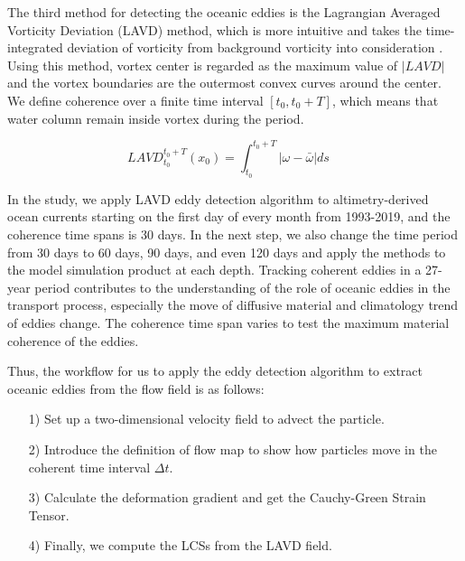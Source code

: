 The third method for detecting the oceanic eddies is the Lagrangian Averaged Vorticity Deviation (LAVD) method, which is more intuitive and takes the time-integrated deviation of vorticity from background vorticity into consideration \cite{haller2016defining,tarshish2018identifying}. Using this method, vortex center is regarded as the maximum value of $|LAVD|$ and the vortex boundaries are the outermost convex curves around the center. We define coherence over a finite time interval $[t_0,t_0+T]$, which means that water column remain inside vortex during the period.


\begin{equation}
    LAVD_{t_0}^{t_0+T}(x_{0})=\int_{t_0}^{t_0+T}|\omega-\bar{\omega}| d s \quad 
\end{equation}

In the study, we apply LAVD eddy detection algorithm to altimetry-derived ocean currents starting on the first day of every month from 1993-2019, and the coherence time spans is 30 days. In the next step, we also change the time period from 30 days to 60 days, 90 days, and even 120 days and apply the methods to the model simulation product at each depth. Tracking coherent eddies in a 27-year period contributes to the understanding of the role of oceanic eddies in the transport process, especially the move of diffusive material and climatology trend of eddies change. The coherence time span varies to test the maximum material coherence of the eddies.


Thus, the workflow for us to apply the eddy detection algorithm to extract oceanic eddies from the flow field is as follows:

\begin{itemize}
  \item [1)] 
  Set up a two-dimensional velocity field to advect the particle.
  \item [2)]
  Introduce the definition of flow map to show how particles move in the coherent time interval $\Delta t$.
  \item [3)]
  Calculate the deformation gradient and get the Cauchy-Green Strain Tensor.
  \item[4)]
  Finally, we compute the LCSs from the LAVD field.
\end{itemize}


